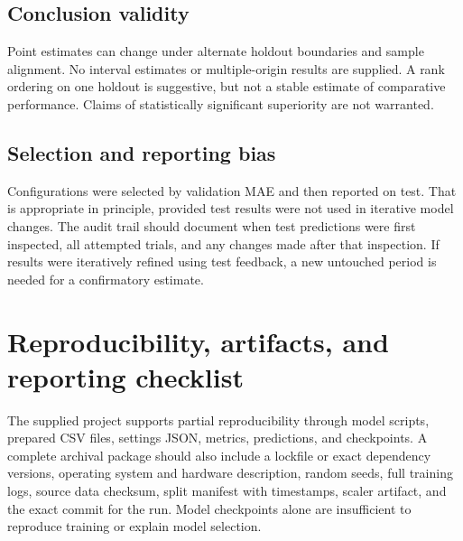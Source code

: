 \documentclass[12pt,a4paper]{article}
\begin{document}
\subsection{Conclusion validity}
Point estimates can change under alternate holdout boundaries and sample alignment. No interval estimates or multiple-origin results are supplied. A rank ordering on one holdout is suggestive, but not a stable estimate of comparative performance. Claims of statistically significant superiority are not warranted.

\subsection{Selection and reporting bias}
Configurations were selected by validation MAE and then reported on test. That is appropriate in principle, provided test results were not used in iterative model changes. The audit trail should document when test predictions were first inspected, all attempted trials, and any changes made after that inspection. If results were iteratively refined using test feedback, a new untouched period is needed for a confirmatory estimate.

\newpage
\section{Reproducibility, artifacts, and reporting checklist}
The supplied project supports partial reproducibility through model scripts, prepared CSV files, settings JSON, metrics, predictions, and checkpoints. A complete archival package should also include a lockfile or exact dependency versions, operating system and hardware description, random seeds, full training logs, source data checksum, split manifest with timestamps, scaler artifact, and the exact commit for the run. Model checkpoints alone are insufficient to reproduce training or explain model selection.
\end{document}
